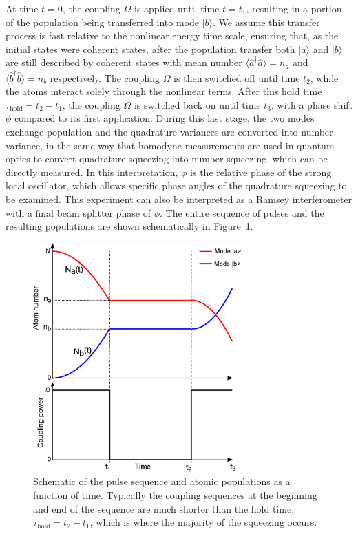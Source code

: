 \documentclass{iopart}
\begin{document}
At time $t=0$, the coupling $\Omega$ is applied until time $t=t_1$, resulting in a portion of the population being transferred into mode $|b\rangle$. We assume this transfer process is fast relative to the nonlinear energy time scale, ensuring that, as the initial states were coherent states, after the population transfer both $|a\rangle$ and $|b\rangle$ are still described by coherent states with mean number $\langle \hat{a}^{\dagger} \hat{a} \rangle = n_a$ and $\langle \hat{b}^{\dagger} \hat{b} \rangle = n_b$ respectively.  The coupling $\Omega$ is then switched off until time $t_2$, while the atoms interact solely through the nonlinear terms. After this hold time $\tau_{\mathrm{hold}} = t_2 - t_1 $, the coupling $\Omega$ is switched back on until time $t_3$, with a phase shift $\phi$ compared to its first application. During this last stage, the two modes exchange population and the quadrature variances are converted into number variance, in the same way that homodyne measurements are used in quantum optics to convert quadrature squeezing into number squeezing, which can be directly measured. In this interpretation, $\phi$ is the relative phase of the strong local oscillator, which allows specific phase angles of the quadrature squeezing to be examined.  This experiment can also be interpreted as a Ramsey interferometer with a final beam splitter phase of $\phi$.  The entire sequence of pulses and the resulting populations are shown schematically in Figure~\ref{figPulseScheme}.

\begin{figure}
    \centering
    \includegraphics[width=8cm]{figures/pulse_scheme.eps}
    \caption{Schematic of the pulse sequence and atomic populations as a function of time.  Typically the coupling sequences at the beginning and end of the sequence are much shorter than the hold time, $\tau_{\mathrm{hold}} = t_2 - t_1 $, which is where the majority of the squeezing occurs.}
    \label{figPulseScheme}
\end{figure}
\end{document}
